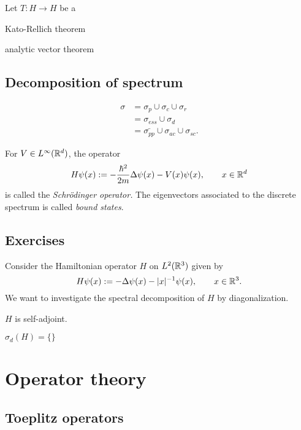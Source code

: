 \documentclass{../../large}
\begin{document}
\begin{prb}
Let $T:H\to H$ be a 
\begin{parts}
\item
\end{parts}
\end{prb}
Kato-Rellich theorem

analytic vector theorem


\section{Decomposition of spectrum}

\begin{align*}
\sigma
&=\sigma_p\cup\sigma_c\cup\sigma_r\\
&=\sigma_{ess}\cup\sigma_d\\
&=\bar{\sigma_{pp}}\cup\sigma_{ac}\cup\sigma_{sc}.
\end{align*}





For $V\in L^\infty(\mathbb{R}^d)$, the operator
\[H\psi(x):=-\frac{\hbar^2}{2m}\Delta\psi(x)-V(x)\psi(x),\qquad x\in\mathbb{R}^d\]
is called the \emph{Schr\"odinger operator.}
The eigenvectors associated to the discrete spectrum is called \emph{bound states}.




\section*{Exercises}

\begin{prb}
Consider the Hamiltonian operator $H$ on $L^2(\mathbb{R}^3)$ given by
\[H\psi(x):=-\Delta\psi(x)-|x|^{-1}\psi(x),\qquad x\in\mathbb{R}^3.\]
We want to investigate the spectral decomposition of $H$ by diagonalization.
\begin{parts}
\item $H$ is self-adjoint.
\item $\sigma_d(H)=\{\}$
\end{parts}
\end{prb}


\chapter{Operator theory}
\section{Toeplitz operators}
\end{document}
